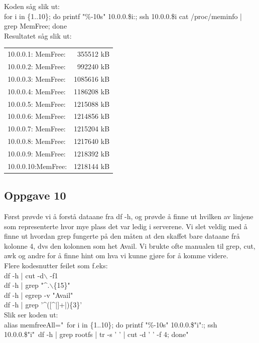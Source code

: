 \documentclass[a4paper, norsk, 12pt]{article}
\begin{document}
Koden såg slik ut:\\
for i in \{1..10\}; do printf "\%-10s" 10.0.0.\$i:; ssh 10.0.0.\$i cat /proc/meminfo | grep MemFree; done\\

Resultatet såg slik ut:\\
\begin{tabular}{lr}
10.0.0.1: MemFree: &         355512 kB\\
10.0.0.2: MemFree: &         992240 kB\\
10.0.0.3: MemFree: &        1085616 kB\\
10.0.0.4: MemFree: &        1186208 kB\\
10.0.0.5: MemFree: &        1215088 kB\\
10.0.0.6: MemFree: &        1214856 kB\\
10.0.0.7: MemFree: &        1215204 kB\\
10.0.0.8: MemFree: &        1217640 kB\\
10.0.0.9: MemFree: &        1218392 kB\\
10.0.0.10:MemFree: &        1218144 kB
\end{tabular}

\subsection*{Oppgave 10}
Først prøvde vi å forstå dataane fra df -h, og prøvde å finne ut hvilken av linjene som representerte hvor mye plass det var ledig i serverene. Vi slet veldig med å finne ut hvordan grep fungerte på den måten at den skaffet bare dataane frå kolonne 4, dvs den kolonnen som het Avail. Vi brukte ofte manualen til grep, cut, awk og andre for å finne hint om hva vi kunne gjøre for å komme videre.\\

Flere kodesnutter feilet som f.eks:\\
df -h | cut -d$\backslash$  -f1\\
df -h | grep "\^{}.$\backslash$\{15\}"\\
df -h | egrep -v "Avail"\\
df -h | grep '\^{}([\^{}|]+|)\{3\}'\\

Slik ser koden ut:\\
alias memfreeAll="\ for i in \{1..10\}; do printf "\%-10s" 10.0.0.\$"i":; ssh 10.0.0.\$"i"\ df -h | grep rootfs | tr -s ' ' | cut -d ' ' -f 4; done"\\
\end{document}
